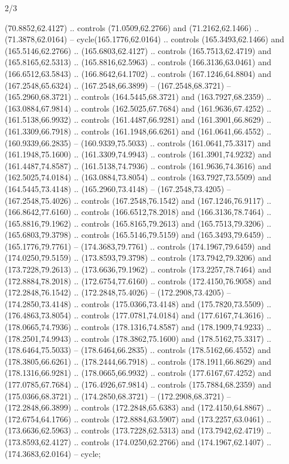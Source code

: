 \begin{flagdescription}{2/3}
\begin{scope}[shift={(0.5\flaglength,0.5)},scale=\flagwidth/320]
\begin{scope}[y=0.8pt, x=0.8pt, yscale=-1,shift={(-118.3,-146)}]
  (70.8852,62.4127) .. controls (71.0509,62.2766) and (71.2162,62.1466) ..
  (71.3878,62.0164) -- cycle(165.1776,62.0164) .. controls (165.3493,62.1466)
  and (165.5146,62.2766) .. (165.6803,62.4127) .. controls (165.7513,62.4719)
  and (165.8165,62.5313) .. (165.8816,62.5963) .. controls (166.3136,63.0461)
  and (166.6512,63.5843) .. (166.8642,64.1702) .. controls (167.1246,64.8804)
  and (167.2548,65.6324) .. (167.2548,66.3899) -- (167.2548,68.3721) --
  (165.2960,68.3721) .. controls (164.5445,68.3721) and (163.7927,68.2359) ..
  (163.0884,67.9814) .. controls (162.5025,67.7684) and (161.9636,67.4252) ..
  (161.5138,66.9932) .. controls (161.4487,66.9281) and (161.3901,66.8629) ..
  (161.3309,66.7918) .. controls (161.1948,66.6261) and (161.0641,66.4552) ..
  (160.9339,66.2835) -- (160.9339,75.5033) .. controls (161.0641,75.3317) and
  (161.1948,75.1600) .. (161.3309,74.9943) .. controls (161.3901,74.9232) and
  (161.4487,74.8587) .. (161.5138,74.7936) .. controls (161.9636,74.3616) and
  (162.5025,74.0184) .. (163.0884,73.8054) .. controls (163.7927,73.5509) and
  (164.5445,73.4148) .. (165.2960,73.4148) -- (167.2548,73.4205) --
  (167.2548,75.4026) .. controls (167.2548,76.1542) and (167.1246,76.9117) ..
  (166.8642,77.6160) .. controls (166.6512,78.2018) and (166.3136,78.7464) ..
  (165.8816,79.1962) .. controls (165.8165,79.2613) and (165.7513,79.3206) ..
  (165.6803,79.3798) .. controls (165.5146,79.5159) and (165.3493,79.6459) ..
  (165.1776,79.7761) -- (174.3683,79.7761) .. controls (174.1967,79.6459) and
  (174.0250,79.5159) .. (173.8593,79.3798) .. controls (173.7942,79.3206) and
  (173.7228,79.2613) .. (173.6636,79.1962) .. controls (173.2257,78.7464) and
  (172.8884,78.2018) .. (172.6754,77.6160) .. controls (172.4150,76.9058) and
  (172.2848,76.1542) .. (172.2848,75.4026) -- (172.2908,73.4205) --
  (174.2850,73.4148) .. controls (175.0366,73.4148) and (175.7820,73.5509) ..
  (176.4863,73.8054) .. controls (177.0781,74.0184) and (177.6167,74.3616) ..
  (178.0665,74.7936) .. controls (178.1316,74.8587) and (178.1909,74.9233) ..
  (178.2501,74.9943) .. controls (178.3862,75.1600) and (178.5162,75.3317) ..
  (178.6464,75.5033) -- (178.6464,66.2835) .. controls (178.5162,66.4552) and
  (178.3805,66.6261) .. (178.2444,66.7918) .. controls (178.1911,66.8629) and
  (178.1316,66.9281) .. (178.0665,66.9932) .. controls (177.6167,67.4252) and
  (177.0785,67.7684) .. (176.4926,67.9814) .. controls (175.7884,68.2359) and
  (175.0366,68.3721) .. (174.2850,68.3721) -- (172.2908,68.3721) --
  (172.2848,66.3899) .. controls (172.2848,65.6383) and (172.4150,64.8867) ..
  (172.6754,64.1766) .. controls (172.8884,63.5907) and (173.2257,63.0461) ..
  (173.6636,62.5963) .. controls (173.7228,62.5313) and (173.7942,62.4719) ..
  (173.8593,62.4127) .. controls (174.0250,62.2766) and (174.1967,62.1407) ..
  (174.3683,62.0164) -- cycle;


\end{scope}
\end{scope}
\end{flagdescription}
